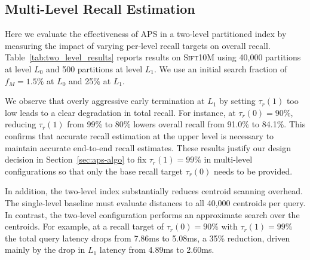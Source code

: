 \subsection{Multi-Level Recall Estimation}
Here we evaluate the effectiveness of APS in a two-level partitioned index by measuring the impact of varying per-level recall targets on overall recall. Table~\ref{tab:two_level_results} reports results on \textsc{Sift10M} using 40{,}000 partitions at level $L_0$ and 500 partitions at level $L_1$. We use an initial search fraction of $f_M = 1.5\%$ at $L_0$ and 25\% at $L_1$.

We observe that overly aggressive early termination at $L_1$ by setting $\tau_r(1)$ too low leads to a clear degradation in total recall. For instance, at $\tau_r(0)=90\%$, reducing $\tau_r(1)$ from 99\% to 80\% lowers overall recall from 91.0\% to 84.1\%. This confirms that accurate recall estimation at the upper level is necessary to maintain accurate end-to-end recall estimates. These results justify our design decision in Section~\ref{sec:aps-algo} to fix $\tau_r(1)=99\%$ in multi-level configurations so that only the base recall target $\tau_r(0)$ needs to be provided.

In addition, the two-level index substantially reduces centroid scanning overhead. The single-level baseline must evaluate distances to all 40{,}000 centroids per query. In contrast, the two-level configuration performs an approximate search over the centroids. For example, at a recall target of $\tau_r(0) = 90\%$ with $\tau_r(1) = 99\%$ the total query latency drops from 7.86ms to 5.08ms, a 35\% reduction, driven mainly by the drop in $L_1$ latency from 4.89ms to 2.60ms.

\label{sec:abl_maintenance}

